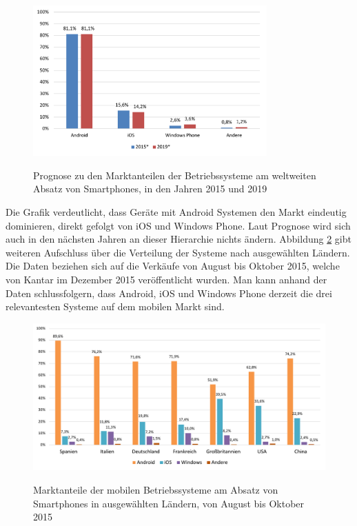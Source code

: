 \begin{figure}[htbp]
	\centering
	\includegraphics[width=0.8\textwidth]{Bilder/Marktanteile_Betriebssysteme}
	\caption{Prognose zu den Marktanteilen der Betriebssysteme am weltweiten Absatz von Smartphones, in den Jahren 2015 und 2019}\label{graph_mobile_systems}\citep{marktanteile_betriebssysteme}
\end{figure}

Die Grafik verdeutlicht, dass Geräte mit Android Systemen den Markt eindeutig dominieren, direkt gefolgt von iOS und Windows Phone. Laut Prognose wird sich auch in den nächsten Jahren an dieser Hierarchie nichts ändern.
Abbildung \ref{graph_mobile_systems_laender} gibt weiteren Aufschluss über die Verteilung der Systeme nach ausgewählten Ländern. Die Daten beziehen sich auf die Verkäufe von August bis Oktober 2015, welche von Kantar \citep{marktanteile_betriebssysteme_laender} im Dezember 2015 veröffentlicht wurden. 
Man kann anhand der Daten schlussfolgern, dass Android, iOS und Windows Phone derzeit die drei relevantesten Systeme auf dem mobilen Markt sind.

\begin{figure}[htbp]
	\centering
	\includegraphics[width=1\textwidth]{Bilder/Marktanteile_nach_Laendern}
	\caption{Marktanteile der mobilen Betriebssysteme am Absatz von Smartphones in ausgewählten Ländern, von August bis Oktober 2015}\label{graph_mobile_systems_laender}\citep{marktanteile_betriebssysteme_laender}
\end{figure}

